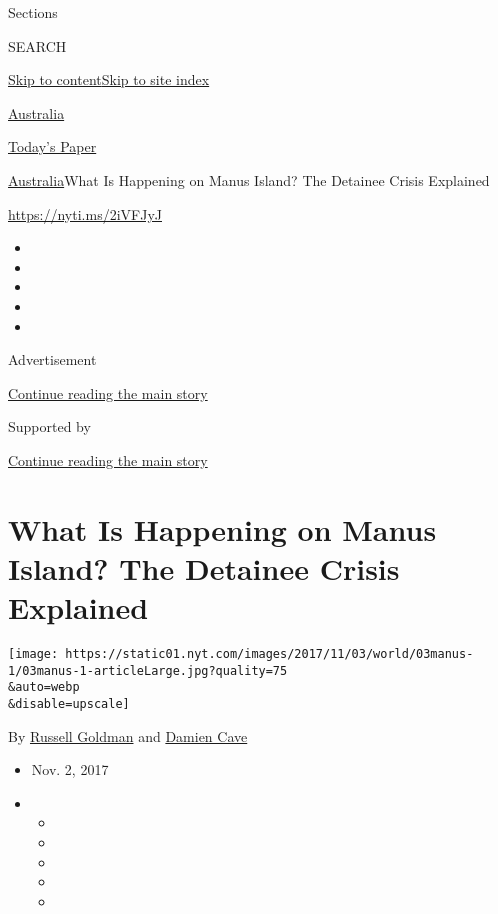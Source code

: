 Sections

SEARCH

\protect\hyperlink{site-content}{Skip to
content}\protect\hyperlink{site-index}{Skip to site index}

\href{https://www.nytimes.com/section/world/australia}{Australia}

\href{https://myaccount.nytimes.com/auth/login?response_type=cookie\&client_id=vi}{}

\href{https://www.nytimes.com/section/todayspaper}{Today's Paper}

\href{/section/world/australia}{Australia}\textbar{}What Is Happening on
Manus Island? The Detainee Crisis Explained

\url{https://nyti.ms/2iVFJyJ}

\begin{itemize}
\item
\item
\item
\item
\item
\end{itemize}

Advertisement

\protect\hyperlink{after-top}{Continue reading the main story}

Supported by

\protect\hyperlink{after-sponsor}{Continue reading the main story}

\hypertarget{what-is-happening-on-manus-island-the-detainee-crisis-explained}{%
\section{What Is Happening on Manus Island? The Detainee Crisis
Explained}\label{what-is-happening-on-manus-island-the-detainee-crisis-explained}}

\texttt{[image: https://static01.nyt.com/images/2017/11/03/world/03manus-1/03manus-1-articleLarge.jpg?quality=75\\\&auto=webp\\\&disable=upscale]}

By \href{http://www.nytimes.com/by/russell-goldman}{Russell Goldman} and
\href{http://www.nytimes.com/by/damien-cave}{Damien Cave}

\begin{itemize}
\item
  Nov. 2, 2017
\item
  \begin{itemize}
  \item
  \item
  \item
  \item
  \item
  \end{itemize}
\end{itemize}

